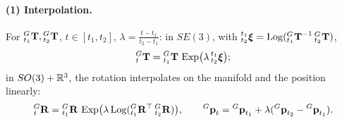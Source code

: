 \paragraph{(1) Interpolation.} For ${}^{G}_{t_1}\boldsymbol{\mathbf{T}},{}^{G}_{t_2}\boldsymbol{\mathbf{T}}$, $t\in[t_1,t_2]$, $\lambda = \tfrac{t-t_1}{t_2-t_1}$: in $SE(3)$, with ${}^{t_1}_{t_2}\boldsymbol{\mathbf{\xi}} = \operatorname{Log}({}^{G}_{t_1}\boldsymbol{\mathbf{T}}^{-1}\,{}^{G}_{t_2}\boldsymbol{\mathbf{T}})$,
\begin{align}
{}^{G}_{t}\boldsymbol{\mathbf{T}} = {}^{G}_{t_1}\boldsymbol{\mathbf{T}}\,\operatorname{Exp}\!\big(\lambda\,{}^{t_1}_{t_2}\boldsymbol{\mathbf{\xi}}\big);
\end{align}
in $SO(3)+\mathbb{R}^3$, the rotation interpolates on the manifold and the position linearly:
\begin{align}
{}^{G}_{t}\boldsymbol{\mathbf{R}} = {}^{G}_{t_1}\boldsymbol{\mathbf{R}}\,\operatorname{Exp}\!\big(\lambda\operatorname{Log}({}^{G}_{t_1}\boldsymbol{\mathbf{R}}^\top\,{}^{G}_{t_2}\boldsymbol{\mathbf{R}})\big), \qquad
{}^{G}\boldsymbol{\mathbf{p}}_{t} = {}^{G}\boldsymbol{\mathbf{p}}_{t_1} + \lambda({}^{G}\boldsymbol{\mathbf{p}}_{t_2} - {}^{G}\boldsymbol{\mathbf{p}}_{t_1}).
\end{align}

